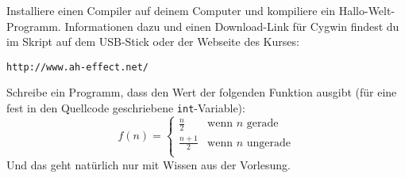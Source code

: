 \documentclass{uebungszettel}
\begin{document}
\begin{aufg}
Installiere einen Compiler auf deinem Computer und kompiliere ein Hallo-Welt-Programm. Informationen dazu und einen Download-Link für Cygwin findest du im Skript auf dem USB-Stick oder der Webseite des Kurses:
\begin{center}
	\verb|http://www.ah-effect.net/ |
\end{center}
\end{aufg}

\begin{aufg}
Schreibe ein Programm, dass den Wert der folgenden Funktion ausgibt (für eine fest in den Quellcode geschriebene \verb|int|-Variable):
\[
	f(n) = \left\{ \begin{array}{ll}
	\frac{n}{2} & \text{wenn } n \text{ gerade} \\
	\frac{n+1}{2} & \text{wenn } n \text{ ungerade} \\
	\end{array}
	\right.
\]
Und das geht natürlich nur mit Wissen aus der Vorlesung.
\end{aufg}
\end{document}
